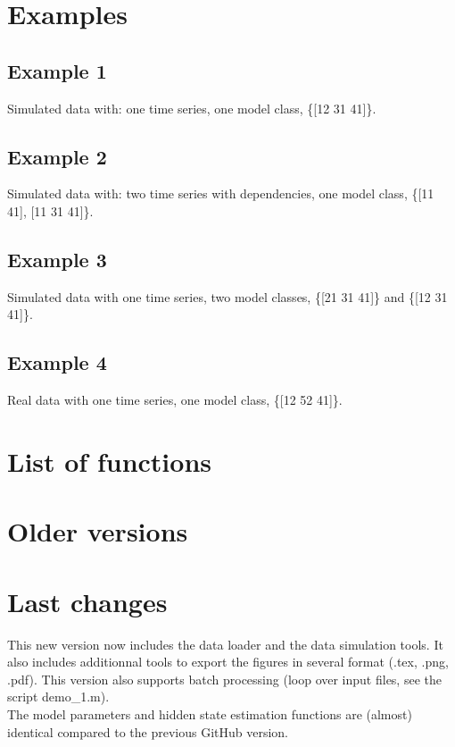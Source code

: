 \documentclass{book}
\begin{document}
\chapter{Examples}
\section{Example 1}
Simulated data with: one time series, one model class, \{[12 31 41]\}.

\section{Example 2}
Simulated data with: two time series with dependencies, one model class, \{[11 41], [11 31 41]\}.

\section{Example 3}
Simulated data with one time series, two model classes, \{[21 31 41]\} and \{[12 31 41]\}.

\section{Example 4}
Real data with one time series, one model class, \{[12 52 41]\}.

\newpage

\chapter{List of functions}
\newpage


\chapter{Older versions}
\newpage

\chapter{Last changes}

This new version now includes the data loader and the data simulation tools.
It also includes additionnal tools to export the figures in several format (.tex, .png, .pdf).
This version also supports batch processing (loop over input files, see the script demo\_1.m). \\

The model parameters and hidden state estimation functions are (almost) identical compared to the previous GitHub version.\\
\end{document}
